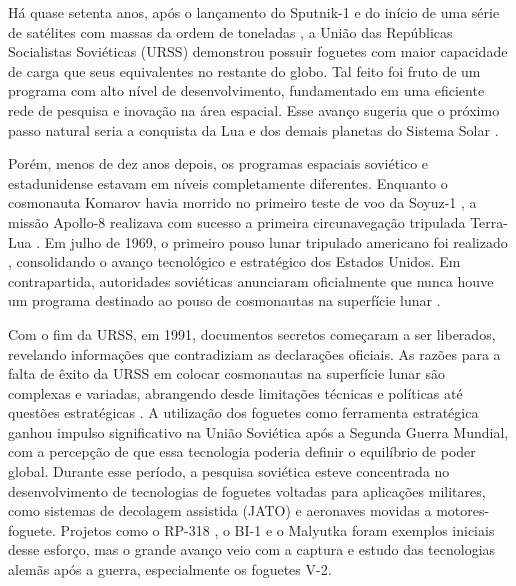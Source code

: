 Há quase setenta anos, após o lançamento do Sputnik-1 \cite{nasa1957} e do início de uma série de satélites com massas da ordem de toneladas \cite{sputnik3}, a União das Repúblicas Socialistas Soviéticas (URSS) demonstrou possuir foguetes com maior capacidade de carga que seus equivalentes no restante do globo. Tal feito foi fruto de um programa com alto nível de desenvolvimento, fundamentado em uma eficiente rede de pesquisa e inovação na área espacial. Esse avanço sugeria que o próximo passo natural seria a conquista da Lua e dos demais planetas do Sistema Solar \cite{betzler2024}.

Porém, menos de dez anos depois, os programas espaciais soviético e estadunidense estavam em níveis completamente diferentes. Enquanto o cosmonauta Komarov havia morrido no primeiro teste de voo da Soyuz-1 \cite{zak2018}, a missão Apollo-8 realizava com sucesso a primeira circunavegação tripulada Terra-Lua \cite{nasaApollo8}. Em julho de 1969, o primeiro pouso lunar tripulado americano foi realizado \cite{nasaApollo11}, consolidando o avanço tecnológico e estratégico dos Estados Unidos. Em contrapartida, autoridades soviéticas anunciaram oficialmente que nunca houve um programa destinado ao pouso de cosmonautas na superfície lunar \cite{betzler2024}.

Com o fim da URSS, em 1991, documentos secretos começaram a ser liberados, revelando informações que contradiziam as declarações oficiais. As razões para a falta de êxito da URSS em colocar cosmonautas na superfície lunar são complexas e variadas, abrangendo desde limitações técnicas e políticas até questões estratégicas \cite{betzler2024}. A utilização dos foguetes como ferramenta estratégica ganhou impulso significativo na União Soviética após a Segunda Guerra Mundial, com a percepção de que essa tecnologia poderia definir o equilíbrio de poder global. Durante esse período, a pesquisa soviética esteve concentrada no desenvolvimento de tecnologias de foguetes voltadas para aplicações militares, como sistemas de decolagem assistida (JATO) \cite{glushko1973} e aeronaves movidas a motores-foguete. Projetos como o RP-318 \cite{RP318}, o BI-1 \cite{BI1} e o Malyutka \cite{Malyutka} foram exemplos iniciais desse esforço, mas o grande avanço veio com a captura e estudo das tecnologias alemãs após a guerra, especialmente os foguetes V-2.

